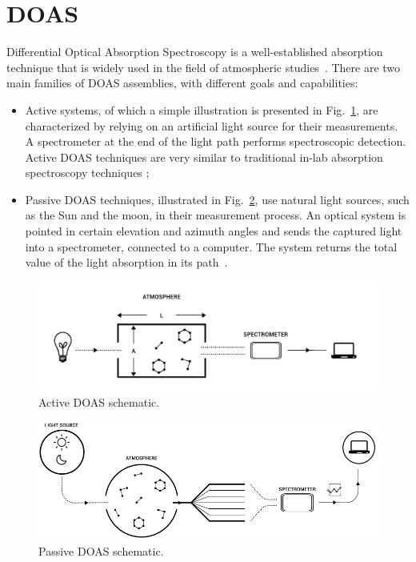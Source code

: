 \section{DOAS}%
\label{sec:doas}

Differential Optical Absorption Spectroscopy is a well-established
absorption technique that is widely used in the field of atmospheric
studies~\cite{Platt2007}. There are two main families of \gls{DOAS}
assemblies, with different goals and capabilities:

\begin{itemize}

        \item Active systems, of which a simple illustration is
            presented in Fig.~\ref{fig:activeSmall}, are characterized
            by relying on an artificial light source for their
            measurements. A spectrometer at the end of the light path
            performs spectroscopic detection. Active DOAS techniques are
            very similar to traditional in-lab absorption spectroscopy
            techniques \cite{Platt2007};

        \item Passive DOAS techniques, illustrated in
            Fig.~\ref{fig:passiveSchematic}, use natural light sources,
            such as the Sun and the moon, in their measurement process.
            An optical system is pointed in certain elevation and
            azimuth angles and sends the captured light into a
            spectrometer, connected to a computer. The system returns
            the total value of the light absorption in its
            path~\cite{Platt2007,Merlaud2013}.

\end{itemize}

 \begin{figure}[t]
    \includegraphics[width=14cm]{img/amt-2016-314-f02.pdf}
    \caption{Active DOAS schematic.}\label{fig:activeSmall}
  \end{figure}

  \begin{figure}[t]
      \includegraphics[width=14cm]{img/amt-2016-314-f03.png}
      \caption{Passive DOAS schematic.}\label{fig:passiveSchematic}
  \end{figure}

